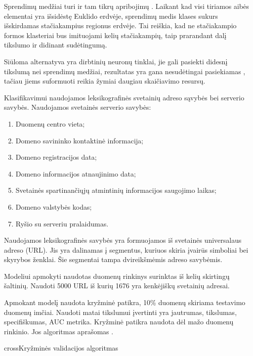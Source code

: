 Sprendimų medžiai turi ir tam tikrų apribojimų \cite{c45}. Laikant kad visi tiriamos aibės elementai yra išsidėstę Euklido erdvėje, sprendimų medis klases sukurs išskirdamas stačiakampius regionus erdvėje. Tai reiškia, kad ne stačiakampio formos klasteriai bus imituojami kelių stačiakampių, taip prarandant dalį tikslumo ir didinant sudėtingumą.

Siūloma alternatyva \cite{c45} yra dirbtinių neuronų tinklai, jie gali pasiekti didesnį tikslumą nei sprendimų medžiai, rezultatas yra gana nesudėtingai pasiekiamas \cite{c45}, tačiau jiems suformuoti reikia žymiai daugiau skaičiavimo resursų.

Klasifikavimui naudojamos leksikografinės svetainių adreso sąvybės bei serverio savybės. Naudojamos svetainės serverio savybės:
\begin{enumerate}[label=\arabic*.]
    \item Duomenų centro vieta;
    \item Domeno savininko kontaktinė informacija;
    \item Domeno registracijos data;
    \item Domeno informacijos atnaujinimo data;
    \item Svetainės spartinančiųjų atmintinių informacijos saugojimo laikas;
    \item Domeno valstybės kodas;
    \item Ryšio su serveriu pralaidumas.
\end{enumerate}

Naudojamos leksikografinės savybės yra formuojamos iš svetainės universalaus adreso (URL). Jis yra dalinamas į segmentus, kuriuos skiria įvairūs simboliai bei skyrybos ženklai. Šie segmentai tampa dvireikšmėmis adreso savybėmis.

Modeliui apmokyti naudotas duomenų rinkinys surinktas iš kelių skirtingų šaltinių. Naudoti 5000 URL iš kurių 1676 yra kenkėjiškų svetainių adresai.

Apmokant modelį naudota kryžminė patikra, 10\% duomenų skiriama testavimo duomenų imčiai. Naudoti matai tikslumui įvertinti yra jautrumas, tikslumas, specifiškumas, AUC metrika. Kryžminė patikra naudota dėl mažo duomenų rinkinio. Jos algoritmas aprašomas .

\begin{ktualgo}{cross}{Kryžminės validacijos algoritmas}
    \EndFor{}
\end{ktualgo}

